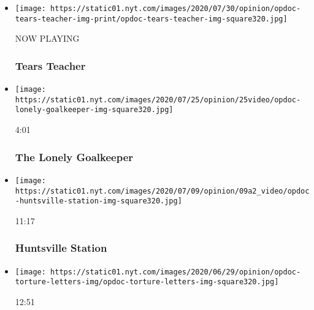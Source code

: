 \begin{itemize}
\item
  \texttt{[image: https://static01.nyt.com/images/2020/07/30/opinion/opdoc-tears-teacher-img-print/opdoc-tears-teacher-img-square320.jpg]}

  NOW PLAYING

  \hypertarget{tears-teacher-2}{%
  \subsubsection{Tears Teacher}\label{tears-teacher-2}}
\item
  \href{https://www.nytimes.com/video/opinion/100000007229285/the-lonely-goalkeeper.html?action=click\&module=video-series-bar\&region=header\&pgtype=Article\&playlistId=video/op-docs}{}

  \texttt{[image: https://static01.nyt.com/images/2020/07/25/opinion/25video/opdoc-lonely-goalkeeper-img-square320.jpg]}

  4:01

  \hypertarget{the-lonely-goalkeeper}{%
  \subsubsection{The Lonely Goalkeeper}\label{the-lonely-goalkeeper}}
\item
  \href{https://www.nytimes.com/video/opinion/100000007080462/huntsville-station.html?action=click\&module=video-series-bar\&region=header\&pgtype=Article\&playlistId=video/op-docs}{}

  \texttt{[image: https://static01.nyt.com/images/2020/07/09/opinion/09a2\_video/opdoc-huntsville-station-img-square320.jpg]}

  11:17

  \hypertarget{huntsville-station}{%
  \subsubsection{Huntsville Station}\label{huntsville-station}}
\item
  \href{https://www.nytimes.com/video/opinion/100000007205588/the-torture-letters.html?action=click\&module=video-series-bar\&region=header\&pgtype=Article\&playlistId=video/op-docs}{}

  \texttt{[image: https://static01.nyt.com/images/2020/06/29/opinion/opdoc-torture-letters-img/opdoc-torture-letters-img-square320.jpg]}

  12:51

  \hypertarget{the-torture-letters}{%
}
\end{itemize}
